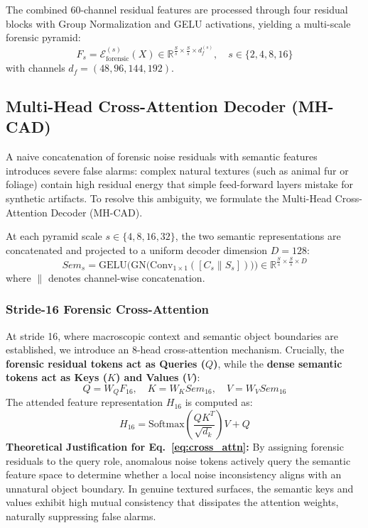 The combined 60-channel residual features are processed through four residual blocks with Group Normalization and GELU activations, yielding a multi-scale forensic pyramid:
\begin{equation}
    F_s = \mathcal{E}_{\mathrm{forensic}}^{(s)}(X) \in \mathbb{R}^{\frac{S}{s} \times \frac{S}{s} \times d_f^{(s)}}, \quad s \in \{2, 4, 8, 16\}
\end{equation}
with channels $d_f = (48, 96, 144, 192)$.

\subsection{Multi-Head Cross-Attention Decoder (MH-CAD)}
A naive concatenation of forensic noise residuals with semantic features introduces severe false alarms: complex natural textures (such as animal fur or foliage) contain high residual energy that simple feed-forward layers mistake for synthetic artifacts. To resolve this ambiguity, we formulate the Multi-Head Cross-Attention Decoder (MH-CAD).

At each pyramid scale $s \in \{4, 8, 16, 32\}$, the two semantic representations are concatenated and projected to a uniform decoder dimension $D = 128$:
\begin{equation}
    Sem_s = \mathrm{GELU}\big(\mathrm{GN}\big(\mathrm{Conv}_{1 \times 1}([C_s \parallel S_s])\big)\big) \in \mathbb{R}^{\frac{S}{s} \times \frac{S}{s} \times D}
\end{equation}
where $\parallel$ denotes channel-wise concatenation.

\subsubsection{Stride-16 Forensic Cross-Attention}
At stride 16, where macroscopic context and semantic object boundaries are established, we introduce an 8-head cross-attention mechanism. Crucially, the \textbf{forensic residual tokens act as Queries ($Q$)}, while the \textbf{dense semantic tokens act as Keys ($K$) and Values ($V$)}:
\begin{equation}
    Q = W_Q F_{16}, \quad K = W_K Sem_{16}, \quad V = W_V Sem_{16}
\end{equation}
The attended feature representation $H_{16}$ is computed as:
\begin{equation}
    H_{16} = \mathrm{Softmax}\left(\frac{Q K^T}{\sqrt{d_k}}\right) V + Q
    \label{eq:cross_attn}
\end{equation}
\noindent\textbf{Theoretical Justification for Eq.~\eqref{eq:cross_attn}:} By assigning forensic residuals to the query role, anomalous noise tokens actively query the semantic feature space to determine whether a local noise inconsistency aligns with an unnatural object boundary. In genuine textured surfaces, the semantic keys and values exhibit high mutual consistency that dissipates the attention weights, naturally suppressing false alarms.

